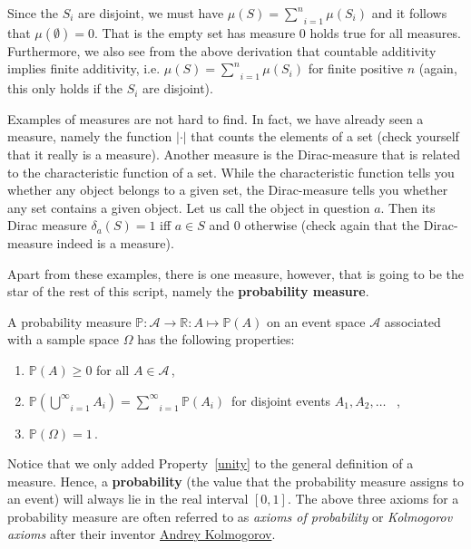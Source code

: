 \documentclass[a4paper,11pt,leqno]{report}
\begin{document}
Since the $ S_{i} $ are disjoint, we
must have $ \mu(S) = \underset{i=1}{\overset{n}{\sum}} \mu (S_{i}) $ and it follows that 
$ \mu(\emptyset) = 0 $.
That is the empty set has measure $ 0 $ holds true for all measures. Furthermore, we also see from the above
derivation that countable additivity implies finite additivity, i.e.
$ \mu(S) = \underset{i=1}{\overset{n}{\sum}} \mu(S_{i}) $ for finite positive $ n $ (again, this only
holds if the $ S_{i} $ are disjoint).

Examples of measures are not hard to find. In fact, we have already seen a measure,
namely the function $ |\cdot| $ that counts the elements of a set (check yourself that it really is a 
measure). Another measure is the Dirac-measure that is related to the characteristic
function of a set. While the characteristic function tells you whether any object belongs to a given set,
the Dirac-measure tells you whether any set contains a given object. Let us call the object in question
$ a $. Then its Dirac measure $ \delta_{a}(S) = 1 $ iff $ a \in S $ and 0 otherwise (check again that the Dirac-measure indeed is a measure).

Apart from these examples, there is one measure, however, that is going to be the star of the rest of this 
script, namely the \textbf{probability measure}.

\begin{Definition} \label{def:probmeasure}
A probability measure $ \mathbb{P}: \mathcal{A} \rightarrow \mathbb{R} : A \mapsto \mathbb{P}(A) $
on an event space $ \mathcal{A} $ associated with a sample space $ \Omega $ has the
following properties:
\begin{enumerate}
\item $ \mathbb{P}(A) \geq 0 $ for all $ A \in \mathcal{A} \,$,
\item $ \mathbb{P}\left( \underset{i = 1}{\overset{\infty}{\bigcup}} A_{i} \right)
= \underset{i = 1}{\overset{\infty}{\sum}} \mathbb{P} \left( A_{i} \right) \,$ for disjoint events $A_1,A_2,\ldots$ \, , \label{union}
\item $ \mathbb{P}(\Omega) = 1 \,$. \label{unity}
\end{enumerate}
\end{Definition}

Notice that we only added Property~\ref{unity} to the general definition of a measure. Hence, a
\textbf{probability} (the value that the probability measure assigns to an event) will always lie in the real interval 
$[0,1]$. The above three axioms for a probability measure are often referred to as \emph{axioms of probability}
or \emph{Kolmogorov axioms} after their inventor \href{https://en.wikipedia.org/wiki/Andrey_Kolmogorov}{Andrey
Kolmogorov}.
\end{document}
